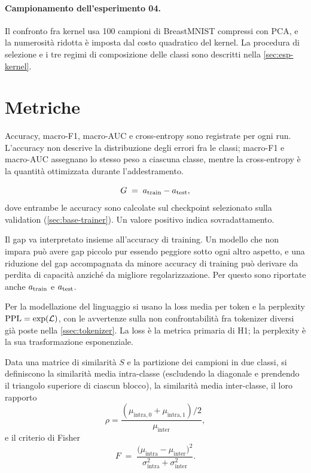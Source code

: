 \paragraph{Campionamento dell'esperimento 04.} Il confronto fra kernel usa 100
campioni di BreastMNIST compressi con PCA, e la numerosità ridotta è imposta dal
costo quadratico del kernel. La procedura di selezione e i tre regimi di
composizione delle classi sono descritti nella \cref{sec:esp-kernel}.

\section{Metriche}
\label{sec:metriche}

Accuracy, macro-F1, macro-AUC e cross-entropy sono registrate per ogni run.
L'accuracy non descrive la distribuzione degli errori fra le classi; macro-F1 e
macro-AUC assegnano lo stesso peso a ciascuna classe, mentre la cross-entropy è la
quantità ottimizzata durante l'addestramento.

\begin{definizione}
\begin{equation}
  G \;=\; a_{\mathrm{train}} - a_{\mathrm{test}} ,
  \label{eq:gap}
\end{equation}
dove entrambe le accuracy sono calcolate sul checkpoint selezionato sulla
validation (\cref{sec:base-trainer}). Un valore positivo indica sovradattamento.
\end{definizione}

Il gap va interpretato insieme all'accuracy di training. Un modello che non impara
può avere gap piccolo pur essendo peggiore sotto ogni altro aspetto, e una
riduzione del gap accompagnata da minore accuracy di training può derivare da
perdita di capacità anziché da migliore regolarizzazione. Per questo sono
riportate anche $a_{\mathrm{train}}$ e $a_{\mathrm{test}}$.

Per la modellazione del linguaggio si usano la loss media per token e la
perplexity $\mathrm{PPL} = \exp(\mathcal{L})$, con le avvertenze sulla non
confrontabilità fra tokenizer diversi già poste nella \cref{ssec:tokenizer}. La
loss è la metrica primaria di H1; la perplexity è la sua trasformazione
esponenziale.

\begin{definizione}
Data una matrice di similarità $S$ e la partizione dei campioni in due classi, si
definiscono la similarità media intra-classe (escludendo la diagonale e prendendo
il triangolo superiore di ciascun blocco), la similarità media inter-classe, il
loro rapporto
\begin{equation}
  \rho = \frac{(\mu_{\text{intra},0} + \mu_{\text{intra},1})/2}{\mu_{\text{inter}}},
  \label{eq:ratio}
\end{equation}
e il criterio di Fisher
\begin{equation}
  F \;=\; \frac{\big(\mu_{\text{intra}} - \mu_{\text{inter}}\big)^2}
                {\sigma^2_{\text{intra}} + \sigma^2_{\text{inter}}} .
  \label{eq:fisher}
\end{equation}
\end{definizione}

